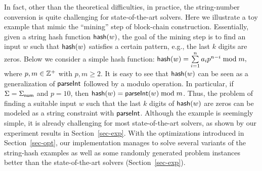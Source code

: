 In fact, other than the theoretical difficulties, in practice, the string-number conversion is quite challenging for state-of-the-art solvers. 
Here we illustrate a toy example that mimic the ``mining'' step of block-chain construction. 
Essentially, given a string hash function ${\sf hash}(w)$, the goal of the mining step is to find an input $w$ such that ${\sf hash}(w)$ satisfies a certain pattern, e.g., the last $k$ digits are zeros. 
Below we consider a simple hash function:
${\sf hash}(w) = \sum \limits_{i = 1}^n a_i p^{n-i} \bmod m,$
where $p, m \in \mathbb{Z}^+$ with $p, m \ge 2$. 
It is easy to see that ${\sf hash}(w)$ can be seen as a generalization of $\textsf{parseInt}$ followed by a modulo operation. 
In particular, if $\Sigma = \Sigma_{\sf num}$ and $p = 10$, then ${\sf hash}(w) = \textsf{parseInt}(w) \bmod m$. Thus, the problem of finding a suitable input $w$ such that the last $k$ digits of ${\sf hash}(w)$ are zeros can be modeled as a string constraint with $\textsf{parseInt}$. Although the example is seemingly simple, it is already challenging for most state-of-the-art solvers, as shown by our experiment results in Section~\ref{sec-exp}. 
With the optimizations introduced in Section~\ref{sec-opt}, 
our implementation manages to solve several variants of the string-hash examples as well as some randomly generated problem instances better than the state-of-the-art solvers (Section~\ref{sec-exp}). 
 



